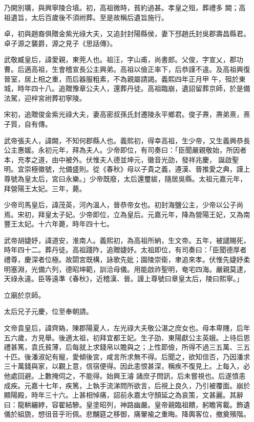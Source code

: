 \begin{pinyinscope}
 乃開別壙，與興寧陵合墳。初，高祖微時，貧約過甚。孝皇之殂，葬禮多
 闕；高祖遺旨，太后百歲後不須祔葬。至是故稱后遺旨施行。



 卓，初與趙裔俱贈金紫光祿大夫，又追封封陽縣侯，妻下邳趙氏封吳郡壽昌縣君。卓子源之襲爵，源之見子《思話傳》。



 武敬臧皇后，諱愛親，東莞人也。祖汪，字山甫，尚書郎。父俊，字宣乂，郡功曹。后適高祖，生會稽宣長公主興弟。高祖以儉正率下，后恭謹不違。及高祖興復晉室，居上相之重，而后器服粗素，不為親屬請謁。義熙四年正月甲
 午，殂於東城，時年四十八。追贈豫章公夫人，還葬丹徒。高祖臨崩，遺詔留葬京師，於是備法駕，迎梓宮祔葬初寧陵。



 宋初，追贈俊金紫光祿大夫，妻高密叔孫氏封遷陵永平鄉君。俊子燾，燾弟熹，熹子質，自有傳。



 武帝張夫人，諱闕，不知何郡縣人也。義熙初，得幸高祖，生少帝，又生義興恭長公主惠媛。永初元年，拜為夫人。少帝即位，有司奏曰：「臣聞嚴親敬始，所因者本，充孝之道，由中被外。伏惟夫人德並坤元，徽音光劭，發祥兆慶，
 誕啟聖明。宜崇極徽號，允備盛則。從《春秋》母以子貴之義，遵漢、晉推愛之典，謹上尊號為皇太后，宮曰永樂。」少帝既廢，太后還璽紱，隨居吳縣。太祖元嘉元年，拜營陽王太妃。三年，薨。



 少帝司馬皇后，諱茂英，河內溫人，晉恭帝女也。初封海鹽公主，少帝以公子尚焉。宋初，拜皇太子妃。少帝即位，立為皇后。元嘉元年，降為營陽王妃，又為南豐王太妃。十六年薨，時年四十七。



 武帝胡婕妤，諱道安，淮南人。義熙初，為高祖所納，生文帝。五年，被譴賜死，時年四十二。葬丹徒。高祖踐阼，追贈婕妤。太祖即位，有司奏曰：「臣聞德厚者禮尊，慶深者位極。故閟宮既構，詠歌先妣；園陵崇衛，聿追來孝。伏惟先婕妤柔明塞淵，光備六列，德昭坤範，訓洽母儀。用能啟祚聖明，奄宅四海。嚴親莫逮，天祿永違。臣等遠準《春秋》，近稽漢、晉。謹上尊號曰章皇太后，陵曰熙寧。」



 立廟於京師。



 太后兄子元慶，位至奉朝請。



 文帝袁皇后，諱齊媯，陳郡陽夏人，左光祿大夫敬公湛之庶女也。母本卑賤，后年五六歲，方見舉。後適太祖，初拜宜都王妃。生子劭、東陽獻公主英娥。上待后恩禮甚篤，袁氏貧薄，后每就上求錢帛以贍與之；上性節儉，所得不過三五萬、三五十匹。後潘淑妃有寵，愛傾後宮，咸言所求無不得。后聞之，欲知信否，乃因潘求三十萬錢與家，以觀上意，信宿便得。因此恚恨甚深，稱疾不復見上。上每入，必他處回避。上數掩伺之，不能得。始興王濬
 諸庶子問訊，后未嘗視也。后遂憤恚成疾。元嘉十七年，疾篤，上執手流涕問所欲言，后視上良久，乃引被覆面。崩於顯陽殿，時年三十六。上甚相悼痛，詔前永嘉太守顏延之為哀策，文甚麗。其辭曰：龍輁纚綍，容翟結驂。皇塗昭列，神路幽嚴。皇帝親臨祖饋，躬瞻宵載。飾遺儀於組旒，想徂音乎珩佩。悲黼筵之移御，痛翬褕之重晦。降輿客位，撤奠殯階。




\end{pinyinscope}
